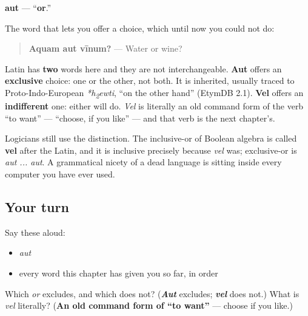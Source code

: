 \begin{cousinweb}
\textbf{aut} — \textquotedblleft{}\textbf{or}.\textquotedblright{}

The word that lets you offer a choice, which until now you could not do:

\begin{quote}
\textbf{Aquam aut vīnum?} — Water or wine?
\end{quote}

Latin has \textbf{two} words here and they are not interchangeable. \textbf{Aut} offers an \textbf{exclusive} choice: one or the other, not both. It is inherited, usually traced to Proto-Indo-European \emph{*h\textsubscript{2}ewti}, \textquotedblleft{}on the other hand\textquotedblright{} (EtymDB 2.1). \textbf{Vel} offers an \textbf{indifferent} one: either will do. \emph{Vel} is literally an old command form of the verb \textquotedblleft{}to want\textquotedblright{} — \textquotedblleft{}choose, if you like\textquotedblright{} — and that verb is the next chapter's.

Logicians still use the distinction. The inclusive-or of Boolean algebra is called \textbf{vel} after the Latin, and it is inclusive precisely because \emph{vel} was; exclusive-or is \emph{aut ... aut}. A grammatical nicety of a dead language is sitting inside every computer you have ever used.
\end{cousinweb}

\subsection*{Your turn}
Say these aloud:

\begin{itemize}
\raggedright
  \item \emph{aut}
  \item every word this chapter has given you so far, in order
\end{itemize}

\begin{tcolorbox}[breakable,colback=teal!4,colframe=teal!35!black,title={Before you move on}]
Which \emph{or} excludes, and which does not? (\emph{\textbf{Aut}} excludes; \emph{\textbf{vel}} does not.) What is \emph{vel} literally? (\textbf{An old command form of \textquotedblleft{}to want\textquotedblright{}} — choose if you like.)
\end{tcolorbox}
